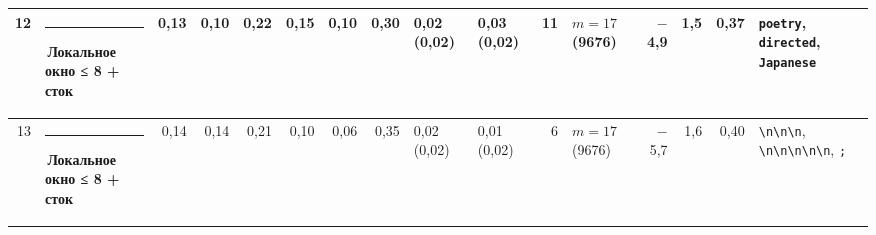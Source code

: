 \documentclass[10pt]{article}
\begin{document}
\begin{minipage}{\linewidth}
\begin{center}
{\begin{tabular}{|r|l|r|r|r|r|r|r|l|l|r|l|r|r|r|l|}
12 & \textcolor[HTML]{1BAF7A}{\rule{0.62em}{0.62em}}\,\textbf{Локальное окно ≤ 8 + сток} & 0,13 & 0,10 & 0,22 & 0,15 & 0,10 & 0,30 & 0,02 (0,02) & 0,03 (0,02) & 11 & $m{=}17$ (9676) & $-$4,9 & 1,5 & 0,37 & \texttt{\textvisiblespace{}poetry}, \texttt{\textvisiblespace{}directed}, \texttt{\textvisiblespace{}Japanese} \\ \hline
13 & \textcolor[HTML]{1BAF7A}{\rule{0.62em}{0.62em}}\,\textbf{Локальное окно ≤ 8 + сток} & 0,14 & 0,14 & 0,21 & 0,10 & 0,06 & 0,35 & 0,02 (0,02) & 0,01 (0,02) & 6 & $m{=}17$ (9676) & $-$5,7 & 1,6 & 0,40 & \texttt{\textvisiblespace{}\textbackslash{}n\textbackslash{}n\textbackslash{}n}, \texttt{\textbackslash{}n\textbackslash{}n\textbackslash{}n\textbackslash{}n\textbackslash{}n}, \texttt{\textvisiblespace{};} \\ \hline
\hline\end{tabular}}\end{center}
\end{minipage}
\par\vspace{0.4em}
\end{document}
